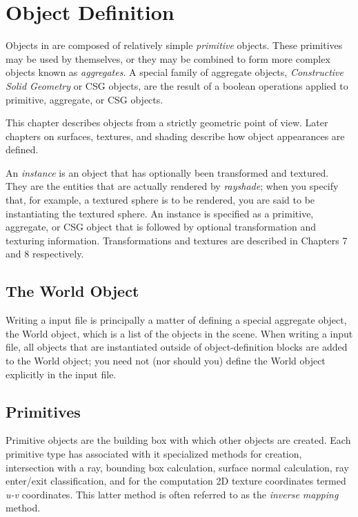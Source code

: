 \chapter{Object Definition}

Objects in \rayshade are composed of relatively simple {\em primitive}
objects.  These primitives may be used by themselves, or they
may be combined to form more complex objects known as {\em aggregates}.
A special family of aggregate objects,
{\em Constructive Solid Geometry} or CSG
objects, are the result of a boolean operations applied to
primitive, aggregate, or CSG objects.

This chapter describes objects from a strictly geometric point of
view.  Later chapters on surfaces, textures, and shading describe
how object appearances are defined.

An {\em instance} is an object that has optionally been transformed
and
textured.  They are the entities that are actually rendered by
{\em rayshade}; when you specify that, for example, a textured
sphere is to be rendered, you are said to be instantiating
the textured sphere.
An instance
is specified as a primitive, aggregate, or CSG object that
is followed by optional transformation and texturing information.
Transformations and textures are described in Chapters 7 and 8 respectively.

\section{The World Object}

Writing a \rayshade input file is principally
a matter of defining a special aggregate object, the World object,
which is a list of the objects in the scene.  When writing a \rayshade
input file, all objects that are instantiated outside of object-definition
blocks are added to the World object; you need not (nor should you)
define the World object explicitly in the input file.

\section{Primitives}

Primitive objects are the building box with which other objects are
created.  Each primitive type has associated with it specialized
methods for
creation,
intersection with a ray,
bounding box calculation,
surface normal calculation,
ray enter/exit classification,
and for the computation 2D texture coordinates termed {\em u-v}
coordinates.
This latter method is often referred to as the {\em inverse mapping}
method.

